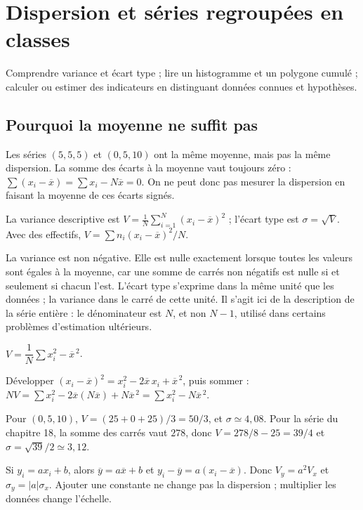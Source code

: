 \documentclass[../cours_2de.tex]{subfiles}
\begin{document}
\setcounter{chapter}{18}
\chapter{Dispersion et séries regroupées en classes}
\label{sec:ch19}
\begin{objectif}
Comprendre variance et écart type ; lire un histogramme et un polygone cumulé ; calculer ou estimer des indicateurs en distinguant données connues et hypothèses.
\end{objectif}
\section{Pourquoi la moyenne ne suffit pas}
Les séries $(5,5,5)$ et $(0,5,10)$ ont la même moyenne, mais pas la même dispersion.
La somme des écarts à la moyenne vaut toujours zéro :
$\sum(x_i-\overline x)=\sum x_i-N\overline x=0$.
On ne peut donc pas mesurer la dispersion en faisant la moyenne de ces écarts signés.
\begin{definition}
La variance descriptive est
$V=\frac1N\sum_{i=1}^N(x_i-\overline x)^2$ ;
l'écart type est $\sigma=\sqrt V$.
Avec des effectifs, $V=\sum n_i(x_i-\overline x)^2/N$.
\end{definition}
La variance est non négative. Elle est nulle exactement lorsque toutes les valeurs sont égales à la moyenne, car une somme de carrés non négatifs est nulle si et seulement si chacun l'est.
L'écart type s'exprime dans la même unité que les données ; la variance dans le carré de cette unité.
Il s'agit ici de la description de la série entière : le dénominateur est $N$, et non $N-1$, utilisé dans certains problèmes d'estimation ultérieurs.
\begin{propriete}
$V=\dfrac1N\sum x_i^2-\overline x^{\,2}$.
\end{propriete}
\begin{demonstration}
Développer $(x_i-\overline x)^2=x_i^2-2\overline x\,x_i+\overline x^{\,2}$, puis sommer :
$NV=\sum x_i^2-2\overline x(N\overline x)+N\overline x^{\,2}
=\sum x_i^2-N\overline x^{\,2}$.
\end{demonstration}
\begin{exemple}
Pour $(0,5,10)$, $V=(25+0+25)/3=50/3$, et $\sigma\simeq4{,}08$.
Pour la série du chapitre 18, la somme des carrés vaut $278$, donc
$V=278/8-25=39/4$ et $\sigma=\sqrt{39}/2\simeq3{,}12$.
\end{exemple}
\begin{demonstration}
Si $y_i=ax_i+b$, alors $\overline y=a\overline x+b$ et
$y_i-\overline y=a(x_i-\overline x)$. Donc $V_y=a^2V_x$ et
$\sigma_y=|a|\sigma_x$. Ajouter une constante ne change pas la dispersion ; multiplier les données change l'échelle.
\end{demonstration}
\end{document}
